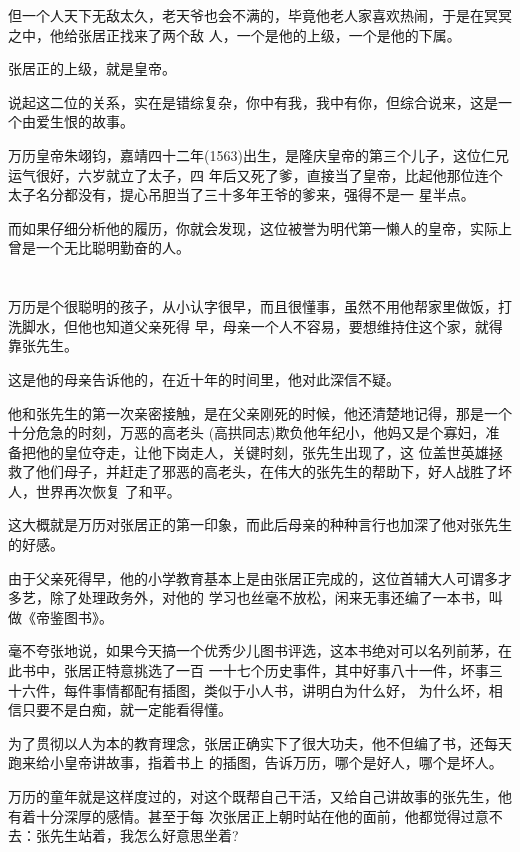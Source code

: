 \documentclass[11pt,a4paper,onecolumn]{article}
\begin{document}
但一个人天下无敌太久，老天爷也会不满的，毕竟他老人家喜欢热闹，于是在冥冥之中，他给张居正找来了两个敌
人，一个是他的上级，一个是他的下属。

张居正的上级，就是皇帝。

说起这二位的关系，实在是错综复杂，你中有我，我中有你，但综合说来，这是一个由爱生恨的故事。

万历皇帝朱翊钧，嘉靖四十二年(1563)出生，是隆庆皇帝的第三个儿子，这位仁兄运气很好，六岁就立了太子，四
年后又死了爹，直接当了皇帝，比起他那位连个太子名分都没有，提心吊胆当了三十多年王爷的爹来，强得不是一
星半点。

而如果仔细分析他的履历，你就会发现，这位被誉为明代第一懒人的皇帝，实际上曾是一个无比聪明勤奋的人。

\section[\thesection]{}

万历是个很聪明的孩子，从小认字很早，而且很懂事，虽然不用他帮家里做饭，打洗脚水，但他也知道父亲死得
早，母亲一个人不容易，要想维持住这个家，就得靠张先生。

这是他的母亲告诉他的，在近十年的时间里，他对此深信不疑。

他和张先生的第一次亲密接触，是在父亲刚死的时候，他还清楚地记得，那是一个十分危急的时刻，万恶的高老头
(高拱同志)欺负他年纪小，他妈又是个寡妇，准备把他的皇位夺走，让他下岗走人，关键时刻，张先生出现了，这
位盖世英雄拯救了他们母子，并赶走了邪恶的高老头，在伟大的张先生的帮助下，好人战胜了坏人，世界再次恢复
了和平。

这大概就是万历对张居正的第一印象，而此后母亲的种种言行也加深了他对张先生的好感。

由于父亲死得早，他的小学教育基本上是由张居正完成的，这位首辅大人可谓多才多艺，除了处理政务外，对他的
学习也丝毫不放松，闲来无事还编了一本书，叫做《帝鉴图书》。

毫不夸张地说，如果今天搞一个优秀少儿图书评选，这本书绝对可以名列前茅，在此书中，张居正特意挑选了一百
一十七个历史事件，其中好事八十一件，坏事三十六件，每件事情都配有插图，类似于小人书，讲明白为什么好，
为什么坏，相信只要不是白痴，就一定能看得懂。

为了贯彻以人为本的教育理念，张居正确实下了很大功夫，他不但编了书，还每天跑来给小皇帝讲故事，指着书上
的插图，告诉万历，哪个是好人，哪个是坏人。

万历的童年就是这样度过的，对这个既帮自己干活，又给自己讲故事的张先生，他有着十分深厚的感情。甚至于每
次张居正上朝时站在他的面前，他都觉得过意不去：张先生站着，我怎么好意思坐着?
\end{document}
